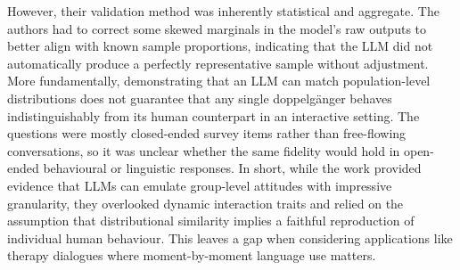 However, their validation method was inherently statistical and aggregate. The authors had to correct some skewed marginals in the model's raw outputs to better align with known sample proportions, indicating that the LLM did not automatically produce a perfectly representative sample without adjustment. More fundamentally, demonstrating that an LLM can match population-level distributions does not guarantee that any single doppelgänger behaves indistinguishably from its human counterpart in an interactive setting. The questions were mostly closed-ended survey items rather than free-flowing conversations, so it was unclear whether the same fidelity would hold in open-ended behavioural or linguistic responses. In short, while the work provided evidence that LLMs can emulate group-level attitudes with impressive granularity, they overlooked dynamic interaction traits and relied on the assumption that distributional similarity implies a faithful reproduction of individual human behaviour. This leaves a gap when considering applications like therapy dialogues where moment-by-moment language use matters.

